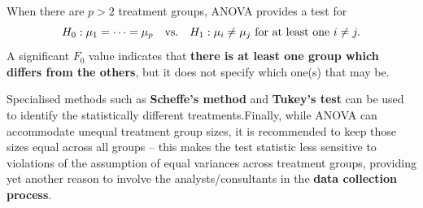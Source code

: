 \newpage\noindent
When there are $p>2$ treatment groups, ANOVA provides a test for $$H_{0}: \mu_{1}  = \cdots = \mu_{p}\quad\text{vs.\@}\quad H_{1}: \mu_{i} \neq \mu_{j} \text{ for at least one } i \neq j.$$ A significant $F_0$ value indicates that \textbf{there is at least one group which differs from the others}, but it does not specify which one(s) that may be. \par Specialised methods such as \textbf{Scheffe's method} and \textbf{Tukey's test} can be used to identify the statistically different treatments.\newl Finally, while ANOVA can accommodate unequal treatment group sizes, it is recommended to keep those sizes equal across all groups -- this  makes the test statistic less sensitive to violations of the assumption of equal variances across treatment groups, providing yet another reason to involve the analysts/consultants in  the \textbf{data collection process}.

